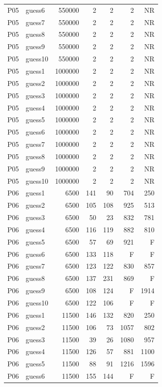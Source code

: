 {\begin{longtable}{llrrrrr}
P05 & guess6 & 550000 & 2 & 2 & 2 & NR \\
P05 & guess7 & 550000 & 2 & 2 & 2 & NR \\
P05 & guess8 & 550000 & 2 & 2 & 2 & NR \\
P05 & guess9 & 550000 & 2 & 2 & 2 & NR \\
P05 & guess10 & 550000 & 2 & 2 & 2 & NR \\
P05 & guess1 & 1000000 & 2 & 2 & 2 & NR \\
P05 & guess2 & 1000000 & 2 & 2 & 2 & NR \\
P05 & guess3 & 1000000 & 2 & 2 & 2 & NR \\
P05 & guess4 & 1000000 & 2 & 2 & 2 & NR \\
P05 & guess5 & 1000000 & 2 & 2 & 2 & NR \\
P05 & guess6 & 1000000 & 2 & 2 & 2 & NR \\
P05 & guess7 & 1000000 & 2 & 2 & 2 & NR \\
P05 & guess8 & 1000000 & 2 & 2 & 2 & NR \\
P05 & guess9 & 1000000 & 2 & 2 & 2 & NR \\
P05 & guess10 & 1000000 & 2 & 2 & 2 & NR \\
P06 & guess1 & 6500 & 141 & 90 & 704 & 250 \\
P06 & guess2 & 6500 & 105 & 108 & 925 & 513 \\
P06 & guess3 & 6500 & 50 & 23 & 832 & 781 \\
P06 & guess4 & 6500 & 116 & 119 & 882 & 810 \\
P06 & guess5 & 6500 & 57 & 69 & 921 & F \\
P06 & guess6 & 6500 & 133 & 118 & F & F \\
P06 & guess7 & 6500 & 123 & 122 & 830 & 857 \\
P06 & guess8 & 6500 & 137 & 231 & 869 & F \\
P06 & guess9 & 6500 & 108 & 124 & F & 1914 \\
P06 & guess10 & 6500 & 122 & 106 & F & F \\
P06 & guess1 & 11500 & 146 & 132 & 820 & 250 \\
P06 & guess2 & 11500 & 106 & 73 & 1057 & 802 \\
P06 & guess3 & 11500 & 39 & 26 & 1080 & 957 \\
P06 & guess4 & 11500 & 126 & 57 & 881 & 1100 \\
P06 & guess5 & 11500 & 88 & 91 & 1216 & 1596 \\
P06 & guess6 & 11500 & 155 & 144 & F & F \\

\end{longtable}}
